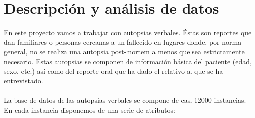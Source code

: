 \documentclass[10pt,a4paper]{article}
\begin{document}
\section{Descripción y análisis de datos}
	\paragraph{}
	En este proyecto vamos a trabajar con autopsias verbales. Éstas son reportes que dan familiares o personas cercanas a un fallecido en lugares donde, por norma general, no se realiza una autopsia post-mortem a menos que sea estrictamente necesario. Estas autopsias se componen de información básica del paciente (edad, sexo, etc.) así como del reporte oral que ha dado el relativo al que se ha entrevistado.
	\paragraph{}
	La base de datos de las autopsias verbales se compone de casi 12000 instancias. En cada instancia disponemos de una serie de atributos:
\end{document}

